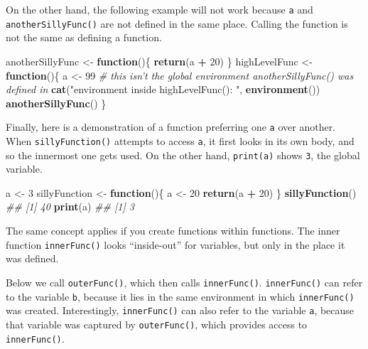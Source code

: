 \documentclass[12pt,krantz2]{krantz}
\makeatletter
\newenvironment{Shaded}{\begin{snugshade}}{\end{snugshade}}
\newcommand{\CommentTok}[1]{\textcolor[rgb]{0.37,0.37,0.37}{\textit{#1}}}
\newcommand{\ControlFlowTok}[1]{\textcolor[rgb]{0.27,0.27,0.27}{\textbf{#1}}}
\newcommand{\DecValTok}[1]{\textcolor[rgb]{0.06,0.06,0.06}{#1}}
\newcommand{\KeywordTok}[1]{\textcolor[rgb]{0.27,0.27,0.27}{\textbf{#1}}}
\newcommand{\NormalTok}[1]{#1}
\newcommand{\OperatorTok}[1]{\textcolor[rgb]{0.43,0.43,0.43}{\textbf{#1}}}
\newcommand{\StringTok}[1]{\textcolor[rgb]{0.5,0.5,0.5}{#1}}
\newenvironment{kframe}{%
\medskip{}
\setlength{\fboxsep}{.8em}
 \def\at@end@of@kframe{}%
 \ifinner\ifhmode%
  \def\at@end@of@kframe{\end{minipage}}%
  \begin{minipage}{\columnwidth}%
 \fi\fi%
 \def\FrameCommand##1{\hskip\@totalleftmargin \hskip-\fboxsep
 \colorbox{shadecolor}{##1}\hskip-\fboxsep
     \hskip-\linewidth \hskip-\@totalleftmargin \hskip\columnwidth}%
 \MakeFramed {\advance\hsize-\width
   \@totalleftmargin\z@ \linewidth\hsize
   \@setminipage}}%
 {\par\unskip\endMakeFramed%
 \at@end@of@kframe}
\renewenvironment{Shaded}{\begin{kframe}}{\end{kframe}}
\makeatother
\begin{document}
On the other hand, the following example will not work because \texttt{a} and \texttt{anotherSillyFunc()} are not defined in the same place. Calling the function is not the same as defining a function.

\begin{Shaded}
\begin{Highlighting}[]
\NormalTok{anotherSillyFunc <-}\StringTok{ }\ControlFlowTok{function}\NormalTok{()\{}
  \KeywordTok{return}\NormalTok{(a }\OperatorTok{+}\StringTok{ }\DecValTok{20}\NormalTok{) }
\NormalTok{\}}
\NormalTok{highLevelFunc <-}\StringTok{ }\ControlFlowTok{function}\NormalTok{()\{}
\NormalTok{  a <-}\StringTok{ }\DecValTok{99}
  \CommentTok{# this isn't the global environment anotherSillyFunc() was defined in}
  \KeywordTok{cat}\NormalTok{(}\StringTok{"environment inside highLevelFunc(): "}\NormalTok{, }\KeywordTok{environment}\NormalTok{())}
  \KeywordTok{anotherSillyFunc}\NormalTok{()}
\NormalTok{\}}
\end{Highlighting}
\end{Shaded}

Finally, here is a demonstration of a function preferring one \texttt{a} over another. When \texttt{sillyFunction()} attempts to access \texttt{a}, it first looks in its own body, and so the innermost one gets used. On the other hand, \texttt{print(a)} shows \texttt{3}, the global variable.

\begin{Shaded}
\begin{Highlighting}[]
\NormalTok{a <-}\StringTok{ }\DecValTok{3}
\NormalTok{sillyFunction <-}\StringTok{ }\ControlFlowTok{function}\NormalTok{()\{}
\NormalTok{  a <-}\StringTok{ }\DecValTok{20}
  \KeywordTok{return}\NormalTok{(a }\OperatorTok{+}\StringTok{ }\DecValTok{20}\NormalTok{) }
\NormalTok{\}}
\KeywordTok{sillyFunction}\NormalTok{()}
\CommentTok{## [1] 40}
\KeywordTok{print}\NormalTok{(a)}
\CommentTok{## [1] 3}
\end{Highlighting}
\end{Shaded}

The same concept applies if you create functions within functions. The inner function \texttt{innerFunc()} looks ``inside-out'' for variables, but only in the place it was defined.

Below we call \texttt{outerFunc()}, which then calls \texttt{innerFunc()}. \texttt{innerFunc()} can refer to the variable \texttt{b}, because it lies in the same environment in which \texttt{innerFunc()} was created. Interestingly, \texttt{innerFunc()} can also refer to the variable \texttt{a}, because that variable was captured by \texttt{outerFunc()}, which provides access to \texttt{innerFunc()}.
\end{document}
